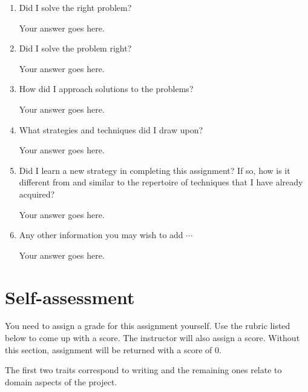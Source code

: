 \documentclass[11pt]{article}
\begin{document}

\begin{enumerate}

   \item Did I solve the right problem? 

       Your answer goes here.

   \item Did I solve the problem right?

       Your answer goes here.

   \item How did I approach solutions to the problems?

       Your answer goes here.

   \item What strategies and techniques did I draw upon? 

       Your answer goes here.

   \item Did I learn a new strategy in completing this assignment? If so, how is it different from and similar to the repertoire of techniques that I have already acquired? 

       Your answer goes here.

   \item Any other information you may wish to add $\cdots$

       Your answer goes here.

\end{enumerate}



\section{Self-assessment} \label{sec:self}

You need to assign a grade for this assignment yourself. Use the rubric listed below to come up with a score. The instructor will also assign a score. Without this section, assignment will be returned with a score of 0.

The first two traits correspond to writing and the remaining ones relate to domain aspects of the project.

\end{document}
